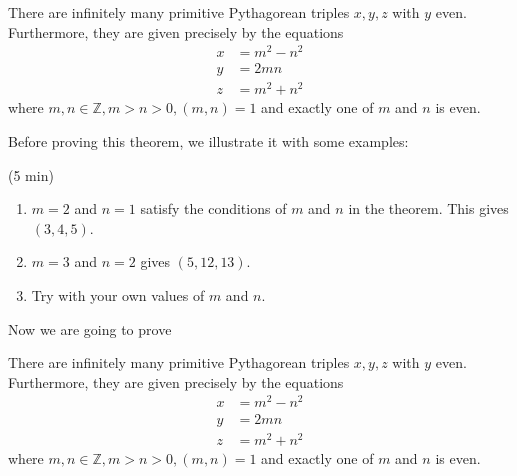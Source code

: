 \documentclass[letterpaper, 11 pt]{article}
\begin{document}
\begin{thm}
 There are infinitely many primitive Pythagorean triples $x,y,z$ with $y$ even. Furthermore, they are given precisely by the equations 
\begin{align*}
 x&=m^2-n^2\\
 y&=2mn\\
 z&=m^2+n^2
\end{align*}
where $m,n\in\mathbb{Z}, m>n>0, (m,n)=1$ and exactly one of $m$ and $n$ is even.
\end{thm}

Before proving this theorem, we illustrate it with some examples:

\begin{br}(5 min)
 
\begin{enumerate}
 \item $m=2$ and $n=1$ satisfy the conditions of $m$ and $n$ in the theorem. This gives $(3,4,5).$
 \item $m=3$ and $n=2$ gives $(5,12,13)$.
 \item Try with your own values of $m$ and $n$.
\end{enumerate}
\end{br}


Now we are going to prove 
\begin{thm}
 There are infinitely many primitive Pythagorean triples $x,y,z$ with $y$ even. Furthermore, they are given precisely by the equations 
\begin{align*}
 x&=m^2-n^2\\
 y&=2mn\\
 z&=m^2+n^2
\end{align*}
where $m,n\in\mathbb{Z}, m>n>0, (m,n)=1$ and exactly one of $m$ and $n$ is even.
\end{thm}
\end{document}
